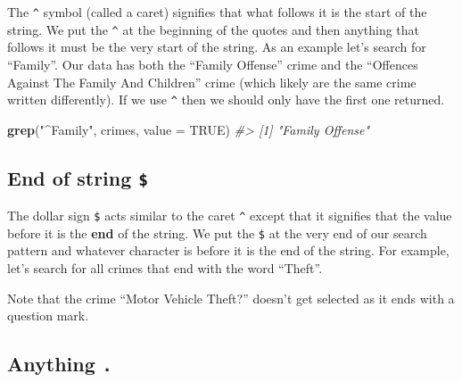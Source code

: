 \documentclass[
  12pt,
]{book}
\newenvironment{Shaded}{\begin{snugshade}}{\end{snugshade}}
\newcommand{\CommentTok}[1]{\textcolor[rgb]{0.37,0.37,0.37}{\textit{#1}}}
\newcommand{\DataTypeTok}[1]{\textcolor[rgb]{0.27,0.27,0.27}{#1}}
\newcommand{\KeywordTok}[1]{\textcolor[rgb]{0.27,0.27,0.27}{\textbf{#1}}}
\newcommand{\NormalTok}[1]{#1}
\newcommand{\OtherTok}[1]{\textcolor[rgb]{0.37,0.37,0.37}{#1}}
\newcommand{\StringTok}[1]{\textcolor[rgb]{0.5,0.5,0.5}{#1}}
\begin{document}
The \texttt{\^{}} symbol (called a caret) signifies that what follows it is the start of the string. We put the \texttt{\^{}} at the beginning of the quotes and then anything that follows it must be the very start of the string. As an example let's search for ``Family''. Our data has both the ``Family Offense'' crime and the ``Offences Against The Family And Children'' crime (which likely are the same crime written differently). If we use \texttt{\^{}} then we should only have the first one returned.

\begin{Shaded}
\begin{Highlighting}[]
\KeywordTok{grep}\NormalTok{(}\StringTok{"\^{}Family"}\NormalTok{, crimes, }\DataTypeTok{value =} \OtherTok{TRUE}\NormalTok{)}
\CommentTok{\#\textgreater{} [1] "Family Offense"}
\end{Highlighting}
\end{Shaded}

\hypertarget{end-of-string}{%
\subsection{\texorpdfstring{End of string \texttt{\$}}{End of string \$}}\label{end-of-string}}

The dollar sign \texttt{\$} acts similar to the caret \texttt{\^{}} except that it signifies that the value before it is the \textbf{end} of the string. We put the \texttt{\$} at the very end of our search pattern and whatever character is before it is the end of the string. For example, let's search for all crimes that end with the word ``Theft''.

\begin{Shaded}
\end{Shaded}

Note that the crime ``Motor Vehicle Theft?'' doesn't get selected as it ends with a question mark.

\hypertarget{anything-.}{%
\subsection{\texorpdfstring{Anything \texttt{.}}{Anything .}}\label{anything-.}}
\end{document}
